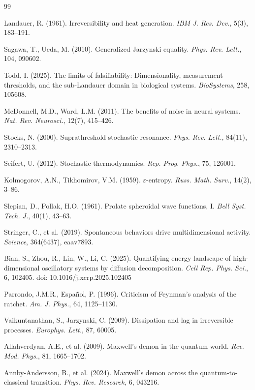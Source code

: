 \documentclass[12pt]{article}
\numberwithin{equation}{section}
\begin{document}
\begin{thebibliography}{99}

Landauer, R. (1961). Irreversibility and heat generation. \textit{IBM J. Res. Dev.}, 5(3), 183--191.

Sagawa, T., Ueda, M. (2010). Generalized Jarzynski equality. \textit{Phys. Rev. Lett.}, 104, 090602.

Todd, I. (2025). The limits of falsifiability: Dimensionality, measurement thresholds, and the sub-Landauer domain in biological systems. \textit{BioSystems}, 258, 105608.

McDonnell, M.D., Ward, L.M. (2011). The benefits of noise in neural systems. \textit{Nat. Rev. Neurosci.}, 12(7), 415--426.

Stocks, N. (2000). Suprathreshold stochastic resonance. \textit{Phys. Rev. Lett.}, 84(11), 2310--2313.

Seifert, U. (2012). Stochastic thermodynamics. \textit{Rep. Prog. Phys.}, 75, 126001.

Kolmogorov, A.N., Tikhomirov, V.M. (1959). $\varepsilon$-entropy. \textit{Russ. Math. Surv.}, 14(2), 3--86.

Slepian, D., Pollak, H.O. (1961). Prolate spheroidal wave functions, I. \textit{Bell Syst. Tech. J.}, 40(1), 43--63.

Stringer, C., et al. (2019). Spontaneous behaviors drive multidimensional activity. \textit{Science}, 364(6437), eaav7893.

Bian, S., Zhou, R., Lin, W., Li, C. (2025). Quantifying energy landscape of high-dimensional oscillatory systems by diffusion decomposition. \textit{Cell Rep. Phys. Sci.}, 6, 102405. doi: 10.1016/j.xcrp.2025.102405

Parrondo, J.M.R., Español, P. (1996). Criticism of Feynman's analysis of the ratchet. \textit{Am. J. Phys.}, 64, 1125--1130.

Vaikuntanathan, S., Jarzynski, C. (2009). Dissipation and lag in irreversible processes. \textit{Europhys. Lett.}, 87, 60005.

Allahverdyan, A.E., et al. (2009). Maxwell's demon in the quantum world. \textit{Rev. Mod. Phys.}, 81, 1665--1702.

Annby-Andersson, B., et al. (2024). Maxwell's demon across the quantum-to-classical transition. \textit{Phys. Rev. Research}, 6, 043216.


\end{thebibliography}
\end{document}
